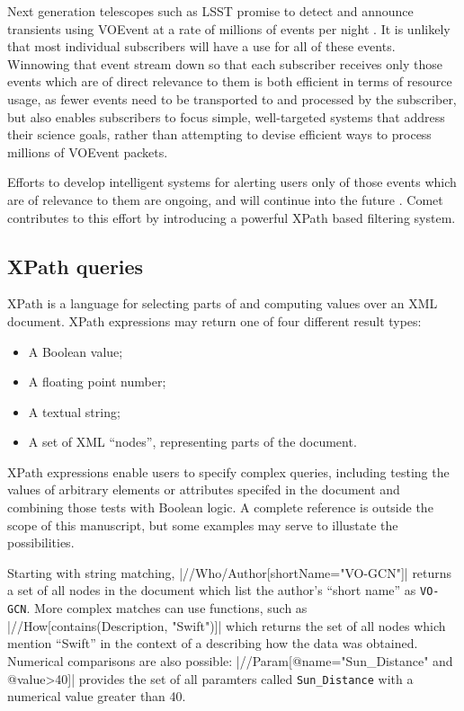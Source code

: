 \documentclass[5p,authoryear]{elsarticle}
\begin{document}
Next generation telescopes such as LSST promise to detect and announce
transients using VOEvent at a rate of millions of events per night
\citep{Kantor:2014}. It is unlikely that most individual subscribers will have
a use for all of these events. Winnowing that event stream down so that each
subscriber receives only those events which are of direct relevance to them is
both efficient in terms of resource usage, as fewer events need to be
transported to and processed by the subscriber, but also enables subscribers
to focus simple, well-targeted systems that address their science goals,
rather than attempting to devise efficient ways to process millions of VOEvent
packets.

Efforts to develop intelligent systems for alerting users only of those events
which are of relevance to them are ongoing, and will continue into the future
\citep{Williams:2009, Matheson:2014}. Comet contributes to this effort by
introducing a powerful XPath \citep{Clark:1999} based filtering system.

\subsection{XPath queries}

XPath is a language for selecting parts of and computing values over an XML
document. XPath expressions may return one of four different result types:

\begin{itemize}
  \item{A Boolean value;}
  \item{A floating point number;}
  \item{A textual string;}
  \item{A set of XML ``nodes'', representing parts of the document.}
\end{itemize}

XPath expressions enable users to specify complex queries, including testing
the values of arbitrary elements or attributes specifed in the document and
combining those tests with Boolean logic. A complete reference is outside the
scope of this manuscript, but some examples may serve to illustate the
possibilities.

Starting with string matching, |//Who/Author[shortName="VO-GCN"]|
returns a set of all nodes in the document which list the author's ``short
name'' as \texttt{VO-GCN}. More complex matches can use functions, such as
|//How[contains(Description, "Swift")]| which returns the set of all
nodes which mention ``Swift'' in the context of a describing how the data was
obtained. Numerical comparisons are also possible:
|//Param[@name="Sun_Distance" and @value>40]| provides the set of
all paramters called \texttt{Sun\_Distance} with a numerical value greater
than 40.
\end{document}
